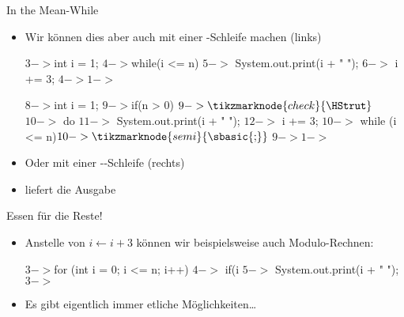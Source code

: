 \iffull
\begin{frame}[fragile]{In the Mean-While}
\DoAnimations
\begin{itemize}
    \itemsep4pt
    \item<2-> Wir können dies aber auch mit einer -Schleife machen (links)
\columns[onlytextwidth,c]
\begin{plainjava}
$3->$int i = 1;
$4->$while(i <= n) {
$5->$    System.out.print(i + " ");
$6->$    i += 3;
$4->$}$1->$
\end{plainjava}
\begin{plainjava}
$8->$int i = 1;
$9->$if(n > 0) {$9->\tikzmarknode{check}{\HStrut}$
$10->$    do {
$11->$        System.out.print(i + " ");
$12->$        i += 3;
$10->$    } while (i <= n)$10->\tikzmarknode{semi}{\text{\sbasic{;}}}$
$9->$}$1->$
\end{plainjava}
\smallskip
\endcolumns
    \item<7-> Oder mit einer --Schleife (rechts)
    \item<15->  liefert die Ausgabe 
\end{itemize}
\end{frame}

\begin{frame}[fragile]{Essen für die Reste!}
\DoAnimations
\begin{itemize}[<+(1)->]
    \itemsep4pt
    \item Anstelle von \(i \gets i + 3\) können wir beispielsweise auch Modulo-Rechnen:
\begin{plainjava}
$3->$for (int i = 0; i <= n; i++) {
$4->$    if(i %
$5->$        System.out.print(i + " ");
$3->$}
\end{plainjava}
    \item<6-> Es gibt eigentlich immer etliche Möglichkeiten\ldots
\end{itemize}
\end{frame}
\fi


